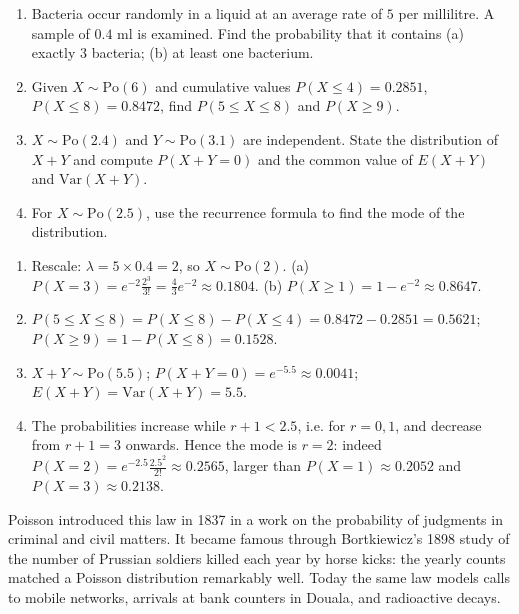 \documentclass[11pt]{article}
\begin{document}
\begin{exercice}[Consolidation]
\begin{enumerate}
\item Bacteria occur randomly in a liquid at an average rate of $5$ per millilitre. A sample of $0.4$ ml is examined. Find the probability that it contains (a) exactly $3$ bacteria; (b) at least one bacterium.
\item Given $X \sim \mathrm{Po}(6)$ and cumulative values $P(X \leq 4) = 0.2851$, $P(X \leq 8) = 0.8472$, find $P(5 \leq X \leq 8)$ and $P(X \geq 9)$.
\item $X \sim \mathrm{Po}(2.4)$ and $Y \sim \mathrm{Po}(3.1)$ are independent. State the distribution of $X + Y$ and compute $P(X + Y = 0)$ and the common value of $E(X+Y)$ and $\mathrm{Var}(X+Y)$.
\item For $X \sim \mathrm{Po}(2.5)$, use the recurrence formula to find the mode of the distribution.
\end{enumerate}
\end{exercice}

\begin{corrige}[Exercise 1]
\begin{enumerate}
\item Rescale: $\lambda = 5 \times 0.4 = 2$, so $X \sim \mathrm{Po}(2)$. (a) $P(X=3) = e^{-2}\frac{2^{3}}{3!} = \frac{4}{3}e^{-2} \approx 0.1804$. (b) $P(X \geq 1) = 1 - e^{-2} \approx 0.8647$.
\item $P(5 \leq X \leq 8) = P(X \leq 8) - P(X \leq 4) = 0.8472 - 0.2851 = 0.5621$; $P(X \geq 9) = 1 - P(X \leq 8) = 0.1528$.
\item $X + Y \sim \mathrm{Po}(5.5)$; $P(X+Y=0) = e^{-5.5} \approx 0.0041$; $E(X+Y) = \mathrm{Var}(X+Y) = 5.5$.
\item The probabilities increase while $r + 1 < 2.5$, i.e. for $r = 0, 1$, and decrease from $r + 1 = 3$ onwards. Hence the mode is $r = 2$: indeed $P(X=2) = e^{-2.5}\frac{2.5^{2}}{2!} \approx 0.2565$, larger than $P(X=1) \approx 0.2052$ and $P(X=3) \approx 0.2138$.
\end{enumerate}
\end{corrige}

\begin{savaistu}
Poisson introduced this law in 1837 in a work on the probability of judgments in criminal and civil matters. It became famous through Bortkiewicz's 1898 study of the number of Prussian soldiers killed each year by horse kicks: the yearly counts matched a Poisson distribution remarkably well. Today the same law models calls to mobile networks, arrivals at bank counters in Douala, and radioactive decays.
\end{savaistu}
\end{document}
